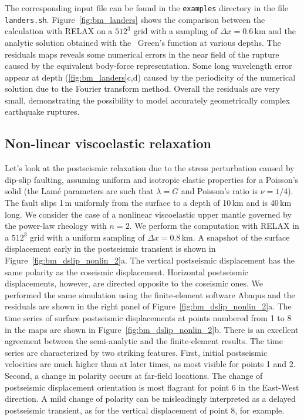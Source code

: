 \documentclass[10pt]{article}
\begin{document}
The corresponding input file can be found in the \verb'examples' directory in the file \verb'landers.sh'. Figure~\ref{fig:bm_landers} shows the comparison between the calculation with RELAX on a $512^3$ grid with a sampling of $\Delta x=0.6\,$km and the analytic solution obtained with the~\cite{okada92} Green's function at various depths. The residuals maps reveals some numerical errors in the near field of the rupture caused by the equivalent body-force representation. Some long wavelength error appear at depth (\ref{fig:bm_landers}c,d) caused by the periodicity of the numerical solution due to the Fourier transform method. Overall the residuals are very small, demonstrating the possibility to model accurately geometrically complex earthquake ruptures.


\subsection{Non-linear viscoelastic relaxation}
Let's look at the postseismic relaxation due to the stress perturbation caused by dip-slip faulting, assuming uniform and isotropic elastic properties for a Poisson's solid (the Lam{\'e} parameters are such that $\lambda=G$ and Poisson's ratio is $\nu=1/4$). The fault slips 1\,m uniformly from the surface to a depth of 10\,km and is 40\,km long. We consider the case of a nonlinear viscoelastic upper mantle governed by the power-law rheology with $n=2$. We perform the computation with RELAX in a $512^3$ grid with a uniform sampling of $\Delta x=0.8\,$km. A snapshot of the surface displacement early in the postseismic transient is shown in Figure~\ref{fig:bm_dslip_nonlin_2}a. The vertical postseismic displacement has the same polarity as the coseismic displacement. Horizontal postseismic displacements, however, are directed opposite to the coseismic ones. We performed the same simulation using the finite-element software Abaqus and the residuals are shown in the right panel of Figure~\ref{fig:bm_dslip_nonlin_2}a. The time series of surface postseismic displacements at points numbered from 1 to 8 in the maps are shown in Figure~\ref{fig:bm_dslip_nonlin_2}b. There is an excellent agreement between the semi-analytic and the finite-element results. The time series are characterized by two striking features. First, initial postseismic velocities are much higher than at later times, as most visible for points 1 and 2. Second, a change in polarity occurs at far-field locations. The change of postseismic displacement orientation is most flagrant for point 6 in the East-West direction. A mild change of polarity can be misleadingly interpreted as a delayed postseismic transient, as for the vertical displacement of point 8, for example.
\end{document}
